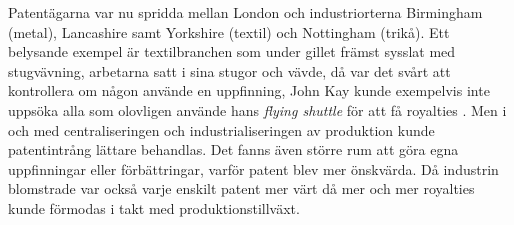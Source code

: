 Patentägarna var nu spridda mellan London och industriorterna Birmingham (metal), Lancashire samt
Yorkshire (textil) och Nottingham (trikå). Ett belysande exempel är textilbranchen som under gillet
främst sysslat med stugvävning, arbetarna satt i sina stugor och vävde, då var det svårt att
kontrollera om någon använde en uppfinning, John Kay kunde exempelvis inte uppsöka alla som olovligen
använde hans \emph{flying shuttle} för att få royalties \cite{macleod}. Men i och med centraliseringen och industrialiseringen av produktion kunde patentintrång lättare behandlas. Det fanns även större rum att göra
egna uppfinningar eller förbättringar, varför patent blev mer önskvärda. Då industrin blomstrade var
också varje enskilt patent mer värt då mer och mer royalties kunde förmodas i takt med
produktionstillväxt.




%
%
%


